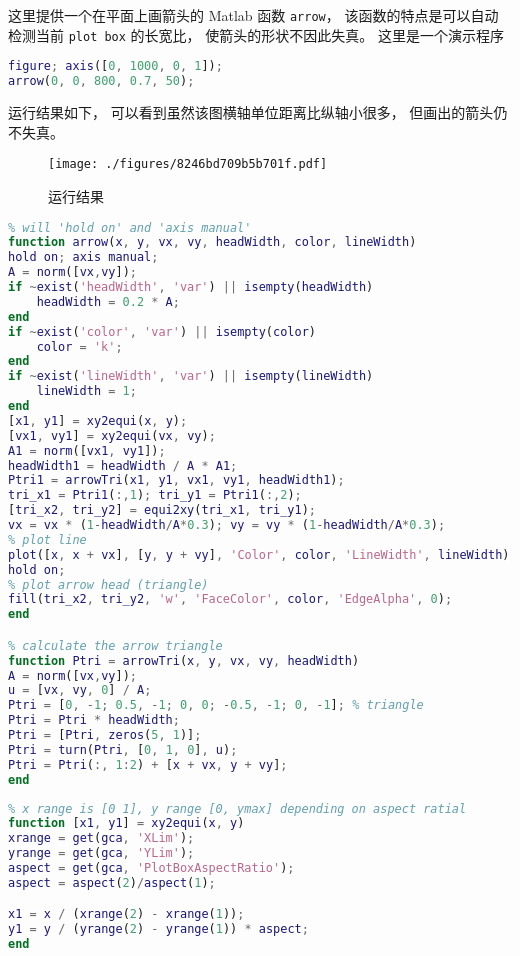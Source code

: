 

这里提供一个在平面上画箭头的 Matlab 函数 \verb|arrow|， 该函数的特点是可以自动检测当前 \verb|plot box| 的长宽比， 使箭头的形状不因此失真。 这里是一个演示程序
\begin{lstlisting}[language=matlab]
figure; axis([0, 1000, 0, 1]);
arrow(0, 0, 800, 0.7, 50);
\end{lstlisting}
运行结果如下， 可以看到虽然该图横轴单位距离比纵轴小很多， 但画出的箭头仍不失真。
\begin{figure}[ht]
\centering
\texttt{[image: ./figures/8246bd709b5b701f.pdf]}
\caption{运行结果} \label{fig_MQuivr_1}
\end{figure}

\begin{lstlisting}[language=matlab, caption=arrow.m]
% plot arrow without distortion by getting current aspect ratio
% will 'hold on' and 'axis manual'
function arrow(x, y, vx, vy, headWidth, color, lineWidth)
hold on; axis manual;
A = norm([vx,vy]);
if ~exist('headWidth', 'var') || isempty(headWidth)
    headWidth = 0.2 * A;
end
if ~exist('color', 'var') || isempty(color)
    color = 'k';
end
if ~exist('lineWidth', 'var') || isempty(lineWidth)
    lineWidth = 1;
end
[x1, y1] = xy2equi(x, y);
[vx1, vy1] = xy2equi(vx, vy);
A1 = norm([vx1, vy1]);
headWidth1 = headWidth / A * A1;
Ptri1 = arrowTri(x1, y1, vx1, vy1, headWidth1);
tri_x1 = Ptri1(:,1); tri_y1 = Ptri1(:,2);
[tri_x2, tri_y2] = equi2xy(tri_x1, tri_y1);
vx = vx * (1-headWidth/A*0.3); vy = vy * (1-headWidth/A*0.3);
% plot line
plot([x, x + vx], [y, y + vy], 'Color', color, 'LineWidth', lineWidth);
hold on;
% plot arrow head (triangle)
fill(tri_x2, tri_y2, 'w', 'FaceColor', color, 'EdgeAlpha', 0);
end

% calculate the arrow triangle
function Ptri = arrowTri(x, y, vx, vy, headWidth)
A = norm([vx,vy]);
u = [vx, vy, 0] / A;
Ptri = [0, -1; 0.5, -1; 0, 0; -0.5, -1; 0, -1]; % triangle
Ptri = Ptri * headWidth;
Ptri = [Ptri, zeros(5, 1)];
Ptri = turn(Ptri, [0, 1, 0], u);
Ptri = Ptri(:, 1:2) + [x + vx, y + vy];
end
\end{lstlisting}

\begin{lstlisting}[language=matlab, caption=xy2equi.m]
% map x, y coordinates to x1, y1 with equal axis
% x range is [0 1], y range [0, ymax] depending on aspect ratial
function [x1, y1] = xy2equi(x, y)
xrange = get(gca, 'XLim');
yrange = get(gca, 'YLim');
aspect = get(gca, 'PlotBoxAspectRatio');
aspect = aspect(2)/aspect(1);

x1 = x / (xrange(2) - xrange(1));
y1 = y / (yrange(2) - yrange(1)) * aspect;
end
\end{lstlisting}

